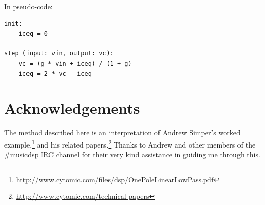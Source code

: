 \documentclass{article}
\begin{document}
In pseudo-code:

\begin{lstlisting}
init:
    iceq = 0

step (input: vin, output: vc):
    vc = (g * vin + iceq) / (1 + g)
    iceq = 2 * vc - iceq
\end{lstlisting}



\section{Acknowledgements}

The method described here is an interpretation of Andrew Simper's worked example,\footnote{\url{http://www.cytomic.com/files/dsp/OnePoleLinearLowPass.pdf}} 
and his related papers.\footnote{\url{http://www.cytomic.com/technical-papers}} 
Thanks to Andrew and other members of the
\#musicdsp IRC channel for their very kind assistance in guiding me
through this.
\end{document}
